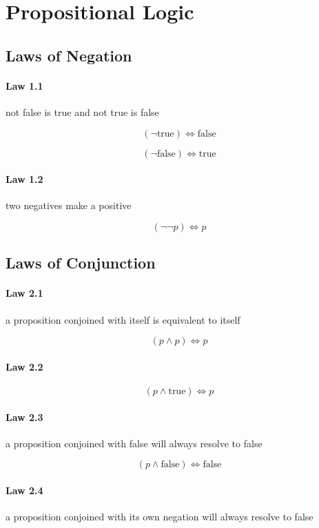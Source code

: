 \documentclass[twocolumn]{article}
\begin{document}
\section{Propositional Logic}

\subsection{Laws of Negation}

\paragraph{Law 1.1} not false is true and not true is false

$$ ( \neg \text{true})  \iff  \text{false} $$

$$ ( \neg \text{false})  \iff  \text{true} $$

\paragraph{Law 1.2} two negatives make a positive

$$ ( \neg  \neg p)  \iff  p $$

\subsection{Laws of Conjunction}

\paragraph{Law 2.1} a proposition conjoined with itself is equivalent to itself

$$ (p  \wedge  p)  \iff  p $$

\paragraph{Law 2.2}

$$ (p  \wedge  \text{true})  \iff  p $$

\paragraph{Law 2.3} a proposition conjoined with false will always resolve to false

$$ (p  \wedge  \text{false})  \iff  \text{false} $$

\paragraph{Law 2.4} a proposition conjoined with its own negation will always resolve to false
\end{document}
